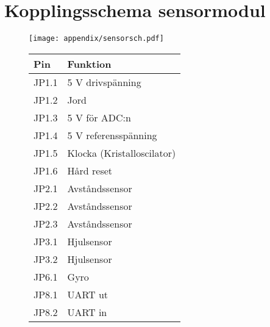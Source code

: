 \newpage
\appendix

\lstset{language=c}
\lstset{linewidth=\textwidth}


\section{Kopplingsschema sensormodul}
\label{sensor-sch}
  \begin{figure}[ht!]
    \centering
      \texttt{[image: appendix/sensorsch.pdf]}
      \begin{tabular}{| l | l |}
        \hline
        \textbf{Pin} & \textbf{Funktion} \\ \hline
        JP1.1 & 5 V drivspänning \\ \hline
        JP1.2 & Jord \\ \hline
        JP1.3 & 5 V för ADC:n \\ \hline
        JP1.4 & 5 V referensspänning \\ \hline
        JP1.5 & Klocka (Kristalloscilator) \\ \hline
        JP1.6 & Hård reset \\ \hline
        JP2.1 & Avståndssensor \\ \hline
        JP2.2 & Avståndssensor \\ \hline
        JP2.3 & Avståndssensor \\ \hline
        JP3.1 & Hjulsensor \\ \hline
        JP3.2 & Hjulsensor \\ \hline
        JP6.1 & Gyro \\ \hline
        JP8.1 & UART ut \\ \hline
        JP8.2 & UART in \\ \hline
      \end{tabular}
    \end{figure}

\newpage

